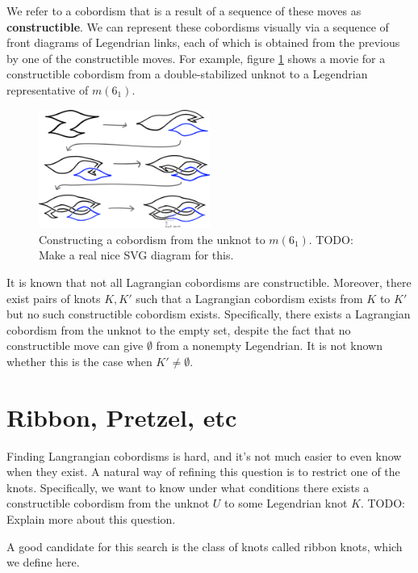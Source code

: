 We refer to a cobordism that is a result of a sequence of these moves as \textbf{constructible}. We can represent these cobordisms visually via a sequence of front diagrams of Legendrian links, each of which is obtained from the previous by one of the constructible moves. For example, figure \ref{fig:cobordism-construction} shows a movie for a constructible cobordism from a double-stabilized unknot to a Legendrian representative of $m(6_1)$.

\begin{figure}[ht!]
    \centering
    \includegraphics[width=0.5\textwidth]{images/cobordism-construction.png}
    \caption{Constructing a cobordism from the unknot to $m(6_1)$.
    TODO: Make a real nice SVG diagram for this.}%
    \label{fig:cobordism-construction}
\end{figure}

It is known that not all Lagrangian cobordisms are constructible. Moreover, there exist pairs of knots $K, K'$ such that a Lagrangian cobordism exists from $K$ to $K'$ but no such constructible cobordism exists. Specifically, there exists a Lagrangian cobordism from the unknot to the empty set, despite the fact that no constructible move can give $\emptyset$ from a nonempty Legendrian. It is not known whether this is the case when $K' \neq \emptyset$.

\section{Ribbon, Pretzel, etc}

Finding Langrangian cobordisms is hard, and it's not much easier to even know when they exist.
A natural way of refining this question is to restrict one of the knots.
Specifically, we want to know under what conditions there exists a constructible cobordism from the unknot $U$ to some Legendrian knot $K$. TODO: Explain more about this question.

A good candidate for this search is the class of knots called ribbon knots, which we define here.

